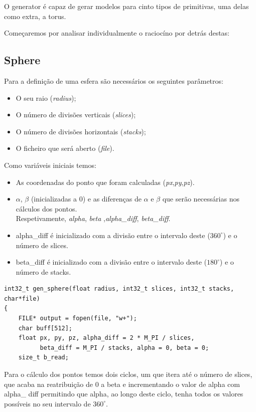 \documentclass[14pt, a4 paper]{article}
\begin{document}
O generator é capaz de gerar modelos para cinto tipos de primitivas, uma delas como extra, a torus.

Começaremos por analisar individualmente o raciocíno por detrás destas:
\subsection{Sphere}
Para a definição de uma esfera são necessários os seguintes parâmetros:

\begin{itemize}
\item O seu raio (\textit{radius});

\item O número de divisões verticais (\textit{slices});

\item O número de divisões horizontais (\textit{stacks});

\item O ficheiro que será aberto (\textit{file}).
\end{itemize}

Como variáveis iniciais temos:
\begin{itemize}
\item As coordenadas do ponto que foram calculadas (\textit{px},\textit{py},\textit{pz}).

\item $\alpha$, $\beta$ (inicializadas a 0) e as diferenças de $\alpha$ e $\beta$ que serão necessárias nos 
cálculos dos pontos.\\
Respetivamente, \textit{alpha}, \textit{beta} ,\textit{alpha\_diff}, \textit{beta\_diff}.

\item{alpha\_diff} é inicializado com a divisão entre o intervalo deste ($360^{\circ}$) e o número de slices.

\item{beta\_diff} é inicializado com a divisão entre o intervalo deste ($180^{\circ}$) e o número de stacks.

\end{itemize}
\begin{lstlisting} 
int32_t gen_sphere(float radius, int32_t slices, int32_t stacks, char*file)
{
	FILE* output = fopen(file, "w+");
	char buff[512];
	float px, py, pz, alpha_diff = 2 * M_PI / slices,
	      beta_diff = M_PI / stacks, alpha = 0, beta = 0;
	size_t b_read;
\end{lstlisting}

Para o cálculo dos pontos temos dois ciclos, um que itera até o número de slices, que acaba na reatribuição de $0$ a beta e incrementando o valor de alpha com alpha\_ diff permitindo que alpha, ao longo deste ciclo, tenha todos os valores possíveis no seu intervalo de $360^{\circ}$.
\end{document}
